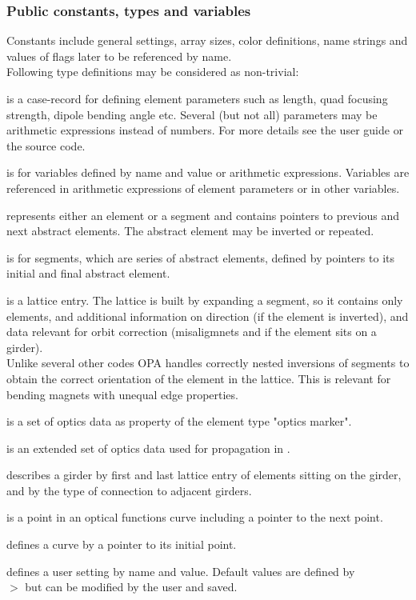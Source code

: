 \documentclass[12pt]{article}
\newcommand\code[1]{{\tt #1}}
\newcommand{\unico}[1]{{\color{burntorange}\code{#1}}}
\newcommand{\prcod}[2]{\opauni{#1}$>$\unico{#2}}
\newcommand{\opauni}[1]{\colorbox{orange!30}{{\color{black}\code{#1}}}}
\newcommand{\ouni}[1]{\hyperref[#1]{\opauni{#1}}}
\newcommand{\pvar}[1]{\subsubsection*{Public constants, types and variables} #1}
\newcommand{\feature}[1]{{\color{cadmiumgreen} #1}}
\begin{document}
\pvar{
Constants include general settings, array sizes, color definitions, name strings and values of flags later to be referenced by name.\\

Following type definitions may be considered as non-trivial:

\unico{ElementType} is a case-record for defining element parameters such as length, quad focusing strength, dipole bending angle etc. Several (but not all) parameters may be arithmetic expressions instead of numbers. For more details see the user guide \cite{userguide} or the source code. 

\unico{variable\_type} is for variables defined by name and value or arithmetic expressions. Variables are referenced in arithmetic expressions of element parameters or in other variables.

\unico{AbstractEleType} represents either an element or a segment and contains pointers to previous and next abstract elements. The abstract element may be inverted or repeated.

\unico{SegmentType} is for segments, which are series of abstract elements, defined by pointers to its initial and final abstract element.

\unico{LatticeType} is a lattice entry. The lattice is built by expanding a segment, so it contains only elements, and additional information on direction (if the element is inverted), and data relevant for orbit correction (misaligmnets and if the element sits on a girder). \\
\feature{Unlike several other codes OPA handles correctly nested inversions of segments to obtain the correct orientation of the element in the lattice. This is relevant for bending magnets with unequal edge properties.}

\unico{OmarkType} is a set of optics data as property of the element type "optics marker".

\unico{OpValType} is an extended set of optics data used for propagation in \ouni{elemlib}.

\unico{GirderType} describes a girder by first and last lattice entry of elements sitting on the girder, and by the type of connection to adjacent girders.

\unico{CurveType} is a point in an optical functions curve including a pointer to the next point.

\unico{CurvePlotType} defines a curve by a pointer to its initial point.

\unico{DefaultType} defines a user setting by name and value. Default values are defined by \\ \prcod{globlib}{Initialization} but can be modified by the user and saved.

}
\end{document}

